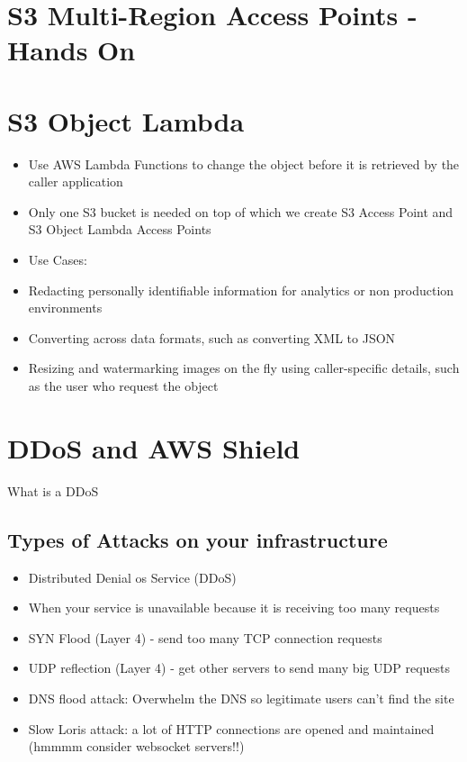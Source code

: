 \section{S3 Multi-Region Access Points - Hands On}


\section{S3 Object Lambda}
\begin{itemize}
    \item Use AWS Lambda Functions to change the object before it is retrieved by the caller application
    \item Only one S3 bucket is needed on top of which we create S3 Access Point and S3 Object Lambda Access Points
    \item Use Cases:
    \item Redacting personally identifiable information for analytics or non production environments
    \item Converting across data formats, such as converting XML to JSON
    \item Resizing and watermarking images on the fly using caller-specific details, such as the user who request the object
\end{itemize}



\section{DDoS and AWS Shield}
What is a DDoS

\subsection{Types of Attacks on your infrastructure}
\begin{itemize}
    \item Distributed Denial os Service (DDoS)
    \item When your service is unavailable because it is receiving too many requests
    \item SYN Flood (Layer 4) - send too many TCP connection requests
    \item UDP reflection (Layer 4) - get other servers to send many big UDP requests
    \item DNS flood attack: Overwhelm the DNS so legitimate users can't find the site
    \item Slow Loris attack: a lot of HTTP connections are opened and maintained (hmmmm consider websocket servers!!)
\end{itemize}

